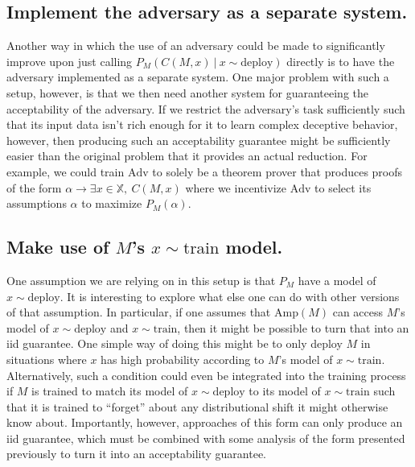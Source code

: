\documentclass{amsart}
\begin{document}
\subsection{Implement the adversary as a separate system.} Another way in which the use of an adversary could be made to significantly improve upon just calling $P_M(C(M, x)\ |\ x \sim \text{deploy})$ directly is to have the adversary implemented as a separate system. One major problem with such a setup, however, is that we then need another system for guaranteeing the acceptability of the adversary. If we restrict the adversary's task sufficiently such that its input data isn't rich enough for it to learn complex deceptive behavior, however, then producing such an acceptability guarantee might be sufficiently easier than the original problem that it provides an actual reduction. For example, we could train $\text{Adv}$ to solely be a theorem prover that produces proofs of the form $\alpha \to \exists x \in \mathbb X,~ C(M, x)$ where we incentivize $\text{Adv}$ to select its assumptions $\alpha$ to maximize $P_M(\alpha)$.

\subsection{Make use of $M$'s $x \sim \text{train}$ model.} One assumption we are relying on in this setup is that $P_M$ have a model of $x \sim \text{deploy}$. It is interesting to explore what else one can do with other versions of that assumption. In particular, if one assumes that $\text{Amp}(M)$ can access $M$'s model of $x \sim \text{deploy}$ and $x \sim \text{train}$, then it might be possible to turn that into an iid guarantee. One simple way of doing this might be to only deploy $M$ in situations where $x$ has high probability according to $M$'s model of $x \sim \text{train}$. Alternatively, such a condition could even be integrated into the training process if $M$ is trained to match its model of $x \sim \text{deploy}$ to its model of $x \sim \text{train}$ such that it is trained to ``forget'' about any distributional shift it might otherwise know about. Importantly, however, approaches of this form can only produce an iid guarantee, which must be combined with some analysis of the form presented previously to turn it into an acceptability guarantee.
\end{document}
